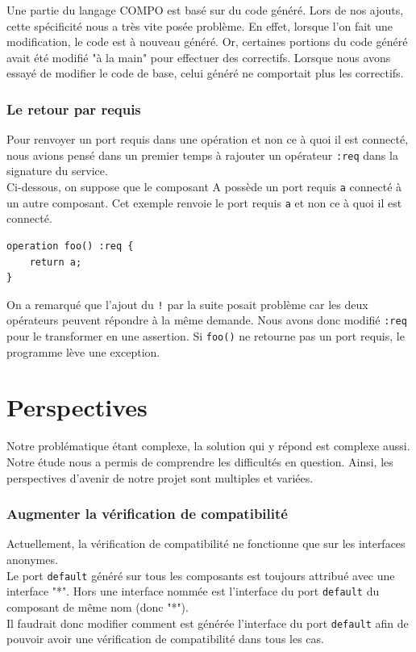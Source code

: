\documentclass[11pt,a4paper,openany,oneside]{book}
\begin{document}
Une partie du langage COMPO est basé sur du code généré. Lors de nos ajouts, cette spécificité nous a très vite posée problème. En effet, lorsque l'on fait une modification, le code est à nouveau généré. Or, certaines portions du code généré avait été modifié "à la main" pour effectuer des correctifs. Lorsque nous avons essayé de modifier le code de base, celui généré ne comportait plus les correctifs.

\subsubsection{Le retour par requis}
Pour renvoyer un port requis dans une opération et non ce à quoi il est connecté, nous avions pensé dans un premier temps à rajouter un opérateur \texttt{:req} dans la signature du service.\\
Ci-dessous, on suppose que le composant A possède un port requis \texttt{a} connecté à un autre composant. Cet exemple renvoie le port requis \texttt{a} et non ce à quoi il est connecté.
\begin{lstlisting}[language=COMPO, frame=single, caption=Syntaxe d'une opération avec \texttt{:req} en COMPO]
operation foo() :req {
    return a;
}
\end{lstlisting}
On a remarqué que l'ajout du \texttt{!} par la suite posait problème car les deux opérateurs peuvent répondre à la même demande. Nous avons donc modifié \texttt{:req} pour le transformer en une assertion. Si \texttt{foo()} ne retourne pas un port requis, le programme lève une exception.

\section{Perspectives}

Notre problématique étant complexe, la solution qui y répond est complexe aussi. Notre étude nous a permis de comprendre les difficultés en question. Ainsi, les perspectives d’avenir de notre projet sont multiples et variées.

\subsubsection{Augmenter la vérification de compatibilité}
Actuellement, la vérification de compatibilité ne fonctionne que sur les interfaces anonymes.\\
Le port \texttt{default} généré sur tous les composants est toujours attribué avec une interface "*". Hors une interface nommée est l'interface du port \texttt{default} du composant de même nom (donc "*").\\
Il faudrait donc modifier comment est générée l'interface du port \texttt{default} afin de pouvoir avoir une vérification de compatibilité dans tous les cas.
\end{document}
